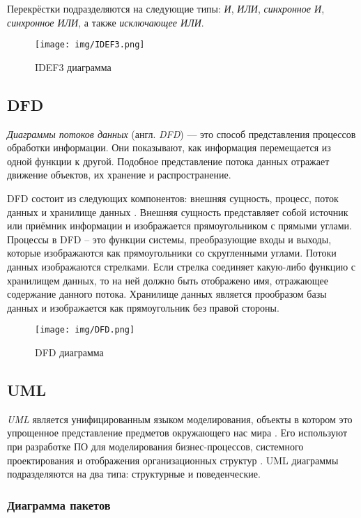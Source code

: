 \documentclass[14pt,russian]{extarticle}
\newcommand*\obj[1]{\textit{#1}}
\newcommand*\term[1]{\textit{#1}}
\begin{document}
Перекрёстки подразделяются на следующие типы: \obj{И}, \obj{ИЛИ},
\obj{синхронное И}, \obj{синхронное ИЛИ}, а также \obj{исключающее ИЛИ}.

\begin{figure}[H]
	\centering
	\texttt{[image: img/IDEF3.png]}
	\caption{IDEF3 диаграмма}
\end{figure}

\subsection{DFD}

\term{Диаграммы потоков данных} (англ. \term{DFD}) –-- это способ представления
процессов обработки информации. Они показывают, как информация перемещается из
одной функции к другой. Подобное представление потока данных отражает движение
объектов, их хранение и распространение.

DFD состоит из следующих компонентов: внешняя сущность, процесс, поток данных и
хранилище данных \cite{dfd}. Внешняя сущность представляет собой источник или приёмник
информации и изображается прямоугольником с прямыми углами. Процессы в DFD – это
функции системы, преобразующие входы и выходы, которые изображаются как
прямоугольники со скругленными углами. Потоки данных изображаются стрелками.
Если стрелка соединяет какую-либо функцию с хранилищем данных, то на ней должно
быть отображено имя, отражающее содержание данного потока. Хранилище данных
является прообразом базы данных и изображается как прямоугольник без правой
стороны.

\begin{figure}[H]
	\centering
	\texttt{[image: img/DFD.png]}
	\caption{DFD диаграмма}
\end{figure}

\subsection{UML}

\term{UML} является унифицированным языком моделирования, объекты в котором это
упрощенное представление предметов окружающего нас мира \cite{hunt}. Его используют при
разработке ПО для моделирования бизнес-процессов, системного проектирования и
отображения организационных структур \cite{fowler}. UML диаграммы подразделяются на два типа:
структурные и поведенческие.

\subsubsection{Диаграмма пакетов}
\end{document}

